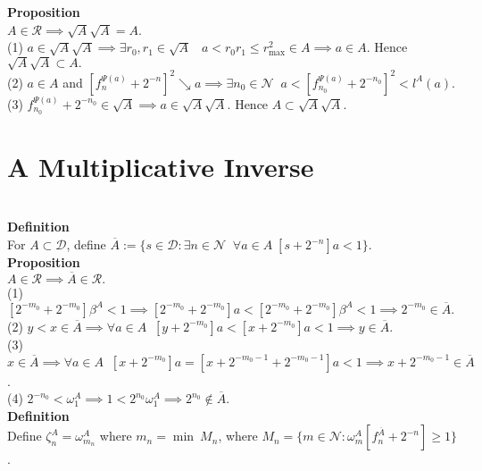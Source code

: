 \documentclass{article}
\newcommand{\targetset}{ \mathscr{R}}
\newcommand{\sourceset}{ \mathscr{D}}
\newcommand{\naturals}{ \mathscr{N}}
\newcommand{\carpenter}{ \omega }
\newcommand{\leaper}{l}
\newcommand{\elt}{a}
\newcommand{\altelt}{s}
\newcommand{\rooter}{\Psi}
\newcommand{\invmark}{\overline}
\newcommand{\umbrella}{\beta}
\newcommand{\prevert}{\zeta}
\begin{document}
\textbf{Proposition}\\
$A \in \targetset \implies \sqrt{A} \sqrt{A} = A$.\\ 

(1) $\elt \in \sqrt{A} \sqrt{A}\implies \exists r_0, r_1 \in \sqrt{A} \;\;\; \elt < r_0r_1 \le r_{\max}^2 \in A \implies \elt \in A$. Hence $\sqrt{A} \sqrt{A} \subset A.$\\
(2) $a \in A$ and  $[f^{\rooter(a)}_n + 2^{-n}]^2 \searrow a \implies \exists n_0 \in \naturals \;\; a < [f^{\rooter(a)}_{n_0} + 2^{-n_0}]^2 < \leaper^A(a) $.\\
(3) $ f^{\rooter(a)}_{n_0} + 2^{-n_0} \in \sqrt{A} \implies a \in \sqrt{A}\sqrt{A}$. Hence $A \subset \sqrt{A} \sqrt{A}$.\\ 

\section{A Multiplicative Inverse}\\

\textbf{Definition}\\
For $A \subset \sourceset$, define $\invmark A := \{ \altelt \in \sourceset : \exists n \in \naturals \;\; \forall a \in A \; [\altelt + 2^{-n}]a < 1\}$.\\

\textbf{Proposition}\\
$A \in \targetset \implies \invmark A \in \targetset.$\\

(1) $[2^{-m_0} + 2^{-m_0} ]\umbrella^A < 1 \implies [2^{-m_0} + 2^{-m_0} ]a < [2^{-m_0} + 2^{-m_0} ]\umbrella^A < 1 \implies 2^{-m_0} \in \invmark A.$\\
(2) $y < x \in \invmark A \implies  \forall \elt \in A \;\; [ y + 2^{-m_0} ]a <  [ x + 2^{-m_0} ]a< 1 \implies y \in \invmark A$.\\
(3) $x \in \invmark A \implies \forall \elt \in A \;\; [x + 2^{-m_0}]a = [x + 2^{-m_0-1} + 2^{-m_0-1}]a < 1 \implies x + 2^{-m_0-1} \in \invmark A$.\\
(4) $2^{-n_0} < \carpenter^A_1 \implies 1 < 2^{n_0} \carpenter^A_1 \implies 2^{n_0} \notin \invmark A$.\\

\textbf{Definition}\\
Define $\prevert^{A}_n = \carpenter^A_{m_n}$ where $m_n = \min\ M_n$, where $M_n = \{ m \in \naturals : \carpenter^A_m [ f^{\invmark A}_n + 2^{-n}] \ge 1 \}$.\\
\end{document}
